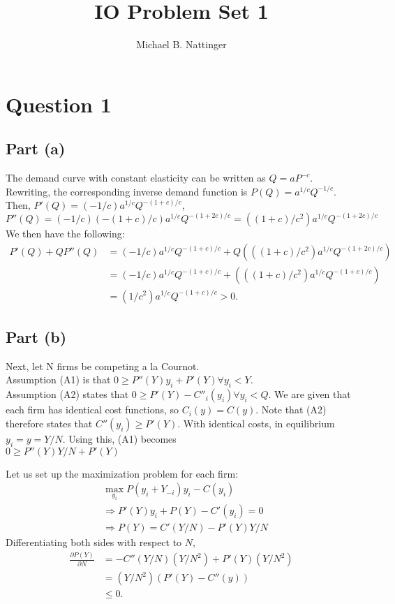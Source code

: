 \documentclass[11pt]{article} %
\title{IO Problem Set 1}
\author{Michael B. Nattinger}
\begin{document}
\maketitle

\section{Question 1}
\subsection{Part (a)}
The demand curve with constant elasticity can be written as $Q = aP^{-c}$. Rewriting, the corresponding inverse demand function is $P(Q) = a^{1/c}Q^{-1/c}.$ Then, $P'(Q) = (-1/c)a^{1/c}Q^{-(1+c)/c}$, $P''(Q) = (-1/c)(-(1+c)/c) a^{1/c}Q^{-(1+2c)/c} = ((1+c)/c^2) a^{1/c}Q^{-(1+2c)/c}$ We then have the following:
\begin{align*}
P'(Q) + Q P''(Q) &=  (-1/c)a^{1/c}Q^{-(1+c)/c} + Q( ((1+c)/c^2) a^{1/c}Q^{-(1+2c)/c}) \\
 &=  (-1/c)a^{1/c}Q^{-(1+c)/c} + ( ((1+c)/c^2) a^{1/c}Q^{-(1+c)/c}) \\
&=(1/c^2)a^{1/c}Q^{-(1+c)/c}>0.
\end{align*}

\subsection{Part (b)}
Next, let N firms be competing a la Cournot.\\ Assumption (A1) is that $0\geq P''(Y)y_i + P'(Y) \forall y_i<Y.$ \\Assumption (A2) states that $0\geq P'(Y) - C''_i(y_i) \forall y_i < Q.$ We are given that each firm has identical cost functions, so $C_i(y) = C(y).$ Note that (A2) therefore states that $C''(y_i) \geq P'(Y)$. With identical costs, in equilibrium $y_i = y = Y/N$. Using this, (A1) becomes \\ $0\geq P''(Y)Y/N + P'(Y)$ %

Let us set up the maximization problem for each firm:
\begin{align*}
&\max_{y_i} P(y_i + Y_{-i})y_i - C(y_i)\\
&\Rightarrow P'(Y)y_i + P(Y) - C'(y_i) = 0\\
&\Rightarrow P(Y) = C'(Y/N) - P'(Y)Y/N \label{eq1} \tag{1}
\end{align*}
Differentiating both sides with respect to $N$,
\begin{align*}
\frac{\partial P(Y)}{\partial N} &= -C''(Y/N)(Y/N^2) +P'(Y)(Y/N^2) \\
&= (Y/N^2)(P'(Y) - C''(y))\\
&\leq 0.
\end{align*}
\end{document}
